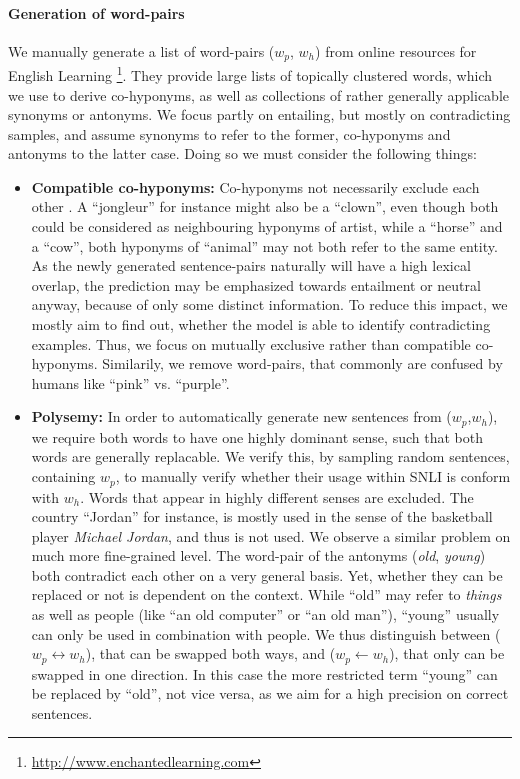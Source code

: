 \paragraph*{Generation of word-pairs}
We manually generate a list of word-pairs ($w_p$, $w_h$) from online resources for English Learning \footnote{\href{http://www.enchantedlearning.com}{http://www.enchantedlearning.com}}. They provide large lists of topically clustered words, which we use to derive co-hyponyms, as well as collections of rather generally applicable synonyms or antonyms. We focus partly on entailing, but mostly on contradicting samples, and assume synonyms to refer to the former, co-hyponyms and antonyms to the latter case. Doing so we must consider the following things:
\begin{itemize}
\item \textbf{Compatible co-hyponyms:} Co-hyponyms not necessarily exclude each other \citep{kruszewski2015so}. A ``jongleur'' for instance might also be a ``clown'', even though both could be considered as neighbouring hyponyms of artist, while a ``horse'' and a ``cow'', both hyponyms of ``animal'' may not both refer to the same entity. As the newly generated sentence-pairs naturally will have a high lexical overlap, the prediction may be emphasized towards entailment or neutral anyway, because of only some distinct information. To reduce this impact, we mostly aim to find out, whether the model is able to identify contradicting examples. Thus, we focus on mutually exclusive rather than compatible co-hyponyms. Similarily, we remove word-pairs, that commonly are confused by humans like ``pink'' vs. ``purple''. 
\item \textbf{Polysemy:} In order to automatically generate new sentences from ($w_p$,$w_h$), we require both words to have one highly dominant sense, such that both words are generally replacable. We verify this, by sampling random sentences, containing $w_p$, to manually verify whether their usage within \ac{SNLI} is conform with $w_h$. Words that appear in highly different senses are excluded. The country ``Jordan'' for instance, is mostly used in the sense of the basketball player \textit{Michael Jordan}, and thus is not used. We observe a similar problem on much more fine-grained level. The word-pair of the antonyms (\textit{old}, \textit{young}) both contradict each other on a very general basis. Yet, whether they can be replaced or not is dependent on the context. While ``old'' may refer to \textit{things} as well as people (like ``an old computer'' or ``an old man''), ``young'' usually can only be used in combination with people. We thus distinguish between ($w_p \leftrightarrow w_h$), that can be swapped both ways, and ($w_p \leftarrow w_h$), that only can be swapped in one direction. In this case the more restricted term ``young'' can be replaced by ``old'', not vice versa, as we aim for a high precision on correct sentences.

\end{itemize}
